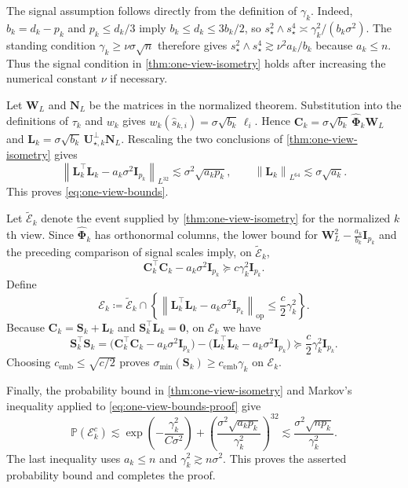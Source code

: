 \documentclass[11pt]{article}
\newcommand{\trans}{\top}
\newcommand{\opn}[1]{\left\lVert #1\right\rVert_{\mathrm{op}}}
\newcommand{\Lqn}[2]{\left\lVert #1\right\rVert_{L^{#2}}}
\newcommand{\cE}{\mathcal{E}}
\newcommand{\cemb}{c_{\mathrm{emb}}}
\begin{document}
The signal assumption follows directly from the definition of $\gamma_k$.
Indeed, $b_k=d_k-p_k$ and $p_k\le d_k/3$ imply
$b_k\le d_k\le3b_k/2$, so
$s_\star^2\wedge s_\star^4
\asymp\gamma_k^2/(b_k\sigma^2)$.
The standing condition $\gamma_k\ge\nu\sigma\sqrt n$ therefore gives
$s_\star^2\wedge s_\star^4
\gtrsim\nu^2a_k/b_k$ because $a_k\le n$.
Thus the signal condition in \cref{thm:one-view-isometry} holds after
increasing the numerical constant $\nu$ if necessary.

Let $\bm W_L$ and $\bm N_L$ be the matrices in the normalized theorem.
Substitution into the definitions of $\tau_k$ and $w_k$ gives
$w_k(\widehat s_{k,i})=\sigma\sqrt{b_k}\,\ell_i$.  Hence
$\bm C_k=\sigma\sqrt{b_k}\,\widehat{\bm\Phi}_k\bm W_L$ and
$\bm L_k=\sigma\sqrt{b_k}\,\bm U_{\star,k}^\perp\bm N_L$.
Rescaling the two conclusions of \cref{thm:one-view-isometry} gives
\begin{equation}
\label{eq:one-view-bounds-proof}
  \Lqn{
    \bm L_k^\trans\bm L_k-a_k\sigma^2\bm I_{p_k}
  }{32}
  \lesssim
  \sigma^2\sqrt{a_kp_k},
  \qquad
  \Lqn{\bm L_k}{64}
  \lesssim
  \sigma\sqrt{a_k}.
\end{equation}
This proves \cref{eq:one-view-bounds}.

Let $\widetilde{\cE}_k$ denote the event supplied by
\cref{thm:one-view-isometry} for the normalized $k$th view.  Since
$\widehat{\bm\Phi}_k$ has orthonormal columns, the lower bound for
$\bm W_L^2-\frac{a_k}{b_k}\bm I_{p_k}$ and the preceding comparison of
signal scales imply, on $\widetilde{\cE}_k$,
\[
  \bm C_k^\trans\bm C_k-a_k\sigma^2\bm I_{p_k}
  \succeq
  c\gamma_k^2\bm I_{p_k}.
\]
Define
\begin{equation}
\label{eq:one-view-view-event}
  \cE_k
  \coloneqq
  \widetilde{\cE}_k
  \cap
  \left\{
    \opn{
      \bm L_k^\trans\bm L_k-a_k\sigma^2\bm I_{p_k}
    }
    \le
    \frac c2\gamma_k^2
  \right\}.
\end{equation}
Because $\bm C_k=\bm S_k+\bm L_k$ and
$\bm S_k^\trans\bm L_k=\bm 0$, on $\cE_k$ we have
\begin{equation}
\label{eq:one-view-signal-Gram-lower}
  \bm S_k^\trans\bm S_k
  =
  \bigl(
    \bm C_k^\trans\bm C_k-a_k\sigma^2\bm I_{p_k}
  \bigr)
  -
  \bigl(
    \bm L_k^\trans\bm L_k-a_k\sigma^2\bm I_{p_k}
  \bigr)
  \succeq
  \frac c2\gamma_k^2\bm I_{p_k}.
\end{equation}
Choosing $\cemb\le\sqrt{c/2}$ proves
$\sigma_{\min}(\bm S_k)\ge\cemb\gamma_k$ on $\cE_k$.

Finally, the probability bound in \cref{thm:one-view-isometry} and Markov's
inequality applied to \cref{eq:one-view-bounds-proof} give
\[
  \mathbb P(\cE_k^c)
  \lesssim
  \exp\left(-\frac{\gamma_k^2}{C\sigma^2}\right)
  +
  \left(
    \frac{\sigma^2\sqrt{a_kp_k}}{\gamma_k^2}
  \right)^{32}
  \lesssim
  \frac{\sigma^2\sqrt{np_k}}{\gamma_k^2}.
\]
The last inequality uses $a_k\le n$ and
$\gamma_k^2\gtrsim n\sigma^2$.  This proves the asserted probability bound
and completes the proof.
\end{document}
